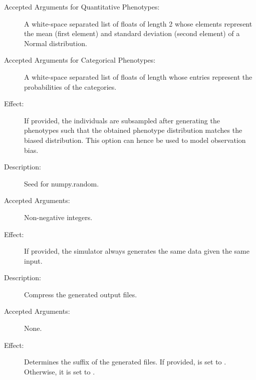 \documentclass[a4paper,10pt,english]{sphinxhowto}
\begin{document}
\begin{description}
\begin{description}
\begin{description}
\item[{Accepted Arguments for Quantitative Phenotypes:}] \leavevmode
A white-space separated list of floats of length 2 whose elements represent the mean (first element) and
standard deviation (second element) of a Normal distribution.

\item[{Accepted Arguments for Categorical Phenotypes:}] \leavevmode
A white-space separated list of floats of length  whose entries represent the probabilities of the 
categories.

\item[{Effect:}] \leavevmode
If provided, the individuals are subsampled after generating the phenotypes such that the obtained phenotype distribution
matches the biased distribution. This option can hence be used to model observation bias.

\end{description}

\item[{\sphinxcode{\sphinxupquote{-{-}seed SEED}}}] \leavevmode\begin{description}
\item[{Description:}] \leavevmode
Seed for numpy.random.

\item[{Accepted Arguments:}] \leavevmode
Non-negative integers.

\item[{Effect:}] \leavevmode
If provided, the simulator always generates the same data given the same input.

\end{description}

\item[{\sphinxcode{\sphinxupquote{-{-}compress}}}] \leavevmode\begin{description}
\item[{Description:}] \leavevmode
Compress the generated output files.

\item[{Accepted Arguments:}] \leavevmode
None.

\item[{Effect:}] \leavevmode
Determines the suffix  of the generated files. If provided,  is set to .
Otherwise, it is set to .


\end{description}
\end{description}
\end{description}
\end{document}
